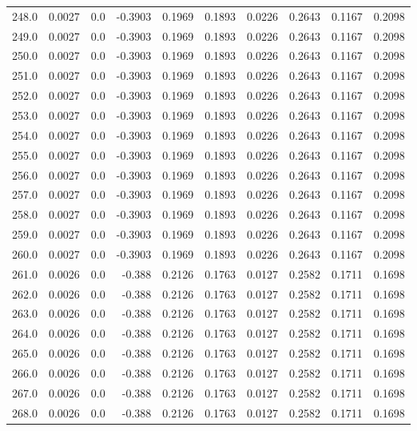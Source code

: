 \begin{longtable}{lrrrrrrrrr}
248.0 & 0.0027 & 0.0 & -0.3903 & 0.1969 & 0.1893 & 0.0226 & 0.2643 & 0.1167 & 0.2098 \\
249.0 & 0.0027 & 0.0 & -0.3903 & 0.1969 & 0.1893 & 0.0226 & 0.2643 & 0.1167 & 0.2098 \\
250.0 & 0.0027 & 0.0 & -0.3903 & 0.1969 & 0.1893 & 0.0226 & 0.2643 & 0.1167 & 0.2098 \\
251.0 & 0.0027 & 0.0 & -0.3903 & 0.1969 & 0.1893 & 0.0226 & 0.2643 & 0.1167 & 0.2098 \\
252.0 & 0.0027 & 0.0 & -0.3903 & 0.1969 & 0.1893 & 0.0226 & 0.2643 & 0.1167 & 0.2098 \\
253.0 & 0.0027 & 0.0 & -0.3903 & 0.1969 & 0.1893 & 0.0226 & 0.2643 & 0.1167 & 0.2098 \\
254.0 & 0.0027 & 0.0 & -0.3903 & 0.1969 & 0.1893 & 0.0226 & 0.2643 & 0.1167 & 0.2098 \\
255.0 & 0.0027 & 0.0 & -0.3903 & 0.1969 & 0.1893 & 0.0226 & 0.2643 & 0.1167 & 0.2098 \\
256.0 & 0.0027 & 0.0 & -0.3903 & 0.1969 & 0.1893 & 0.0226 & 0.2643 & 0.1167 & 0.2098 \\
257.0 & 0.0027 & 0.0 & -0.3903 & 0.1969 & 0.1893 & 0.0226 & 0.2643 & 0.1167 & 0.2098 \\
258.0 & 0.0027 & 0.0 & -0.3903 & 0.1969 & 0.1893 & 0.0226 & 0.2643 & 0.1167 & 0.2098 \\
259.0 & 0.0027 & 0.0 & -0.3903 & 0.1969 & 0.1893 & 0.0226 & 0.2643 & 0.1167 & 0.2098 \\
260.0 & 0.0027 & 0.0 & -0.3903 & 0.1969 & 0.1893 & 0.0226 & 0.2643 & 0.1167 & 0.2098 \\
261.0 & 0.0026 & 0.0 & -0.388 & 0.2126 & 0.1763 & 0.0127 & 0.2582 & 0.1711 & 0.1698 \\
262.0 & 0.0026 & 0.0 & -0.388 & 0.2126 & 0.1763 & 0.0127 & 0.2582 & 0.1711 & 0.1698 \\
263.0 & 0.0026 & 0.0 & -0.388 & 0.2126 & 0.1763 & 0.0127 & 0.2582 & 0.1711 & 0.1698 \\
264.0 & 0.0026 & 0.0 & -0.388 & 0.2126 & 0.1763 & 0.0127 & 0.2582 & 0.1711 & 0.1698 \\
265.0 & 0.0026 & 0.0 & -0.388 & 0.2126 & 0.1763 & 0.0127 & 0.2582 & 0.1711 & 0.1698 \\
266.0 & 0.0026 & 0.0 & -0.388 & 0.2126 & 0.1763 & 0.0127 & 0.2582 & 0.1711 & 0.1698 \\
267.0 & 0.0026 & 0.0 & -0.388 & 0.2126 & 0.1763 & 0.0127 & 0.2582 & 0.1711 & 0.1698 \\
268.0 & 0.0026 & 0.0 & -0.388 & 0.2126 & 0.1763 & 0.0127 & 0.2582 & 0.1711 & 0.1698 \\

\end{longtable}
